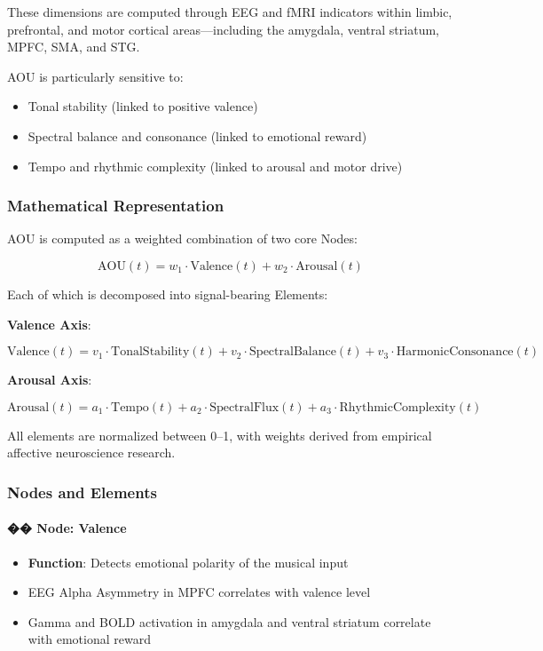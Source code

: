 These dimensions are computed through EEG and fMRI indicators within limbic, prefrontal, and motor cortical areas—including the amygdala, ventral striatum, MPFC, SMA, and STG.

AOU is particularly sensitive to:

\begin{itemize}
    \item Tonal stability (linked to positive valence)
    \item Spectral balance and consonance (linked to emotional reward)
    \item Tempo and rhythmic complexity (linked to arousal and motor drive)
\end{itemize}

\subsubsection*{Mathematical Representation}

AOU is computed as a weighted combination of two core Nodes:

\[
\text{AOU}(t) = w_1 \cdot \text{Valence}(t) + w_2 \cdot \text{Arousal}(t)
\]

Each of which is decomposed into signal-bearing Elements:

\textbf{Valence Axis}:

\[
\text{Valence}(t) = v_1 \cdot \text{TonalStability}(t) + v_2 \cdot \text{SpectralBalance}(t) + v_3 \cdot \text{HarmonicConsonance}(t)
\]

\textbf{Arousal Axis}:

\[
\text{Arousal}(t) = a_1 \cdot \text{Tempo}(t) + a_2 \cdot \text{SpectralFlux}(t) + a_3 \cdot \text{RhythmicComplexity}(t)
\]

All elements are normalized between 0–1, with weights derived from empirical affective neuroscience research.

\subsubsection*{Nodes and Elements}

\paragraph{�� Node: Valence}

\begin{itemize}
    \item \textbf{Function}: Detects emotional polarity of the musical input
    \item EEG Alpha Asymmetry in MPFC correlates with valence level
    \item Gamma and BOLD activation in amygdala and ventral striatum correlate with emotional reward
\end{itemize}

